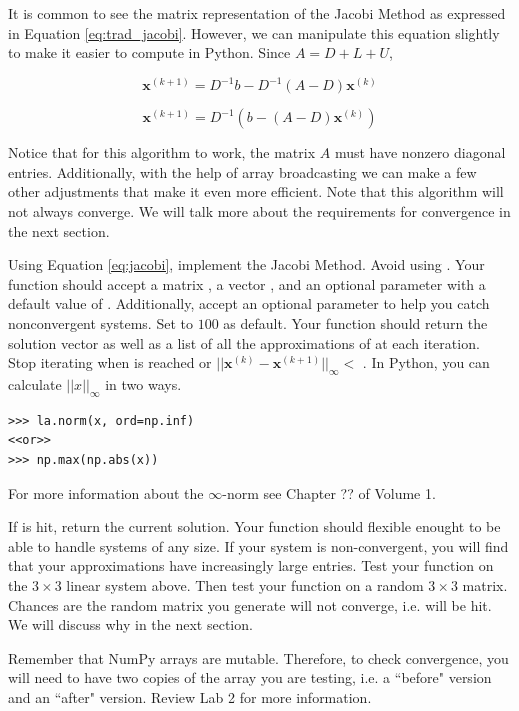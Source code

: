 It is common to see the matrix representation of the Jacobi Method as expressed in
Equation \ref{eq:trad_jacobi}.
However, we can manipulate this equation slightly to make it easier to compute
in Python. Since $A = D + L + U$,

$$\mathbf{x}^{(k+1)} = D^{-1}b - D^{-1}(A-D)\mathbf{x}^{(k)} $$

\begin{equation} \label{eq:jacobi}
\mathbf{x}^{(k+1)} = D^{-1}(b - (A-D)\mathbf{x}^{(k)})
\end{equation}

Notice that for this algorithm to
work, the matrix $A$ must have nonzero diagonal entries. Additionally, with the
help of array broadcasting we can make a few other adjustments that make it even
more efficient. Note that this algorithm will not always converge. We will talk
more about the requirements for convergence in the next section.

\begin{problem} \label{prob:jacobi}
Using Equation \ref{eq:jacobi}, implement the Jacobi Method. Avoid using
. Your function should accept a matrix , a vector , and
an optional parameter  with a default value of . Additionally,
accept an optional parameter  to help you catch nonconvergent
systems. Set  to $100$ as default. Your function should return the
solution vector  as well as a list of all the approximations of 
at each iteration. Stop iterating when  is reached or
$||\mathbf{x}^{(k)} - \mathbf{x}^{(k+1)}||_{\infty} < $ . In Python, you
can calculate $||x||_{\infty}$ in two ways.
\begin{lstlisting}
>>> la.norm(x, ord=np.inf)
<<or>>
>>> np.max(np.abs(x))
\end{lstlisting}
For more information about the $\infty$-norm see Chapter ?? of Volume 1.

If  is hit, return the current solution. Your function should flexible enought
to be able to handle systems of any size. If your
system is non-convergent, you will find that your approximations have increasingly
large entries. Test your function on the $3 \times 3$ linear system above. Then
test your function on a random $3 \times 3$ matrix. Chances are the random matrix
you generate will not converge, i.e.  will be hit.
We will discuss why in the next section.

\begin{info}
Remember that NumPy arrays are mutable. Therefore, to check convergence, you
will need to have two copies of the array you are testing,
i.e. a ``before" version and an ``after" version. Review Lab 2 for more
information.
\end{info}
\end{problem}

